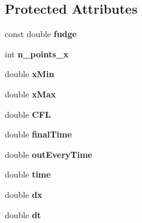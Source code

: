 \subsection*{Protected Attributes}
\begin{DoxyCompactItemize}
\item 
\hypertarget{class_simulation_a33c150f15bbe3345522eba79bd1e8f33}{const double {\bfseries fudge}}\label{class_simulation_a33c150f15bbe3345522eba79bd1e8f33}

\item 
\hypertarget{class_simulation_a92fd8cd6f62935dd3915e6a1dd6eb4ac}{int {\bfseries n\-\_\-points\-\_\-x}}\label{class_simulation_a92fd8cd6f62935dd3915e6a1dd6eb4ac}

\item 
\hypertarget{class_simulation_a67fda8e9da3b2bbc39545dfc4afa9873}{double {\bfseries x\-Min}}\label{class_simulation_a67fda8e9da3b2bbc39545dfc4afa9873}

\item 
\hypertarget{class_simulation_a3c748d2b081bc1c979cc974f420e90ea}{double {\bfseries x\-Max}}\label{class_simulation_a3c748d2b081bc1c979cc974f420e90ea}

\item 
\hypertarget{class_simulation_a6af2df81dac27c93eb75b29c92855049}{double {\bfseries C\-F\-L}}\label{class_simulation_a6af2df81dac27c93eb75b29c92855049}

\item 
\hypertarget{class_simulation_ae3af859b6e8d5fd02c9f4afaeff54e2a}{double {\bfseries final\-Time}}\label{class_simulation_ae3af859b6e8d5fd02c9f4afaeff54e2a}

\item 
\hypertarget{class_simulation_a898090da97cdad9a7715bf2ec078bfa5}{double {\bfseries out\-Every\-Time}}\label{class_simulation_a898090da97cdad9a7715bf2ec078bfa5}

\item 
\hypertarget{class_simulation_a838684076d88a5e923c35c513a1d676c}{double {\bfseries time}}\label{class_simulation_a838684076d88a5e923c35c513a1d676c}

\item 
\hypertarget{class_simulation_a26f1d3168ba61738b6539537fa95fe3b}{double {\bfseries dx}}\label{class_simulation_a26f1d3168ba61738b6539537fa95fe3b}

\item 
\hypertarget{class_simulation_af43e498bfc83c777db5f5ac4025ff923}{double {\bfseries dt}}\label{class_simulation_af43e498bfc83c777db5f5ac4025ff923}


\end{DoxyCompactItemize}
